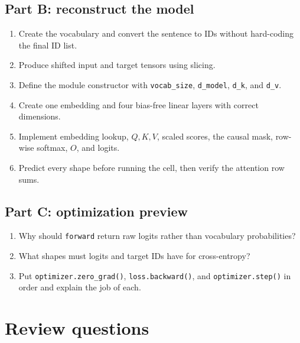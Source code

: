 \documentclass[11pt]{article}
\begin{document}
\subsection*{Part B: reconstruct the model}
\begin{enumerate}
  \item Create the vocabulary and convert the sentence to IDs without hard-coding the final ID list.
  \item Produce shifted input and target tensors using slicing.
  \item Define the module constructor with \texttt{vocab\_size}, \texttt{d\_model}, \texttt{d\_k}, and
  \texttt{d\_v}.
  \item Create one embedding and four bias-free linear layers with correct dimensions.
  \item Implement embedding lookup, $Q,K,V$, scaled scores, the causal mask, row-wise softmax, $O$, and logits.
  \item Predict every shape before running the cell, then verify the attention row sums.
\end{enumerate}

\subsection*{Part C: optimization preview}
\begin{enumerate}
  \item Why should \texttt{forward} return raw logits rather than vocabulary probabilities?
  \item What shapes must logits and target IDs have for cross-entropy?
  \item Put \texttt{optimizer.zero\_grad()}, \texttt{loss.backward()}, and \texttt{optimizer.step()} in order and
  explain the job of each.
\end{enumerate}

\section{Review questions}
\end{document}
